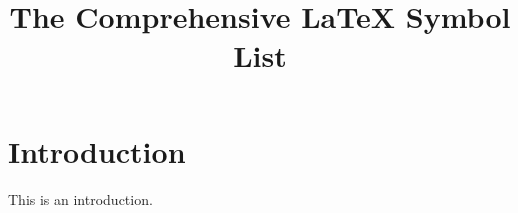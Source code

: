 \documentclass{article}
\title{The Comprehensive LaTeX Symbol List}
\begin{document}
\section{Introduction}

This is an introduction.
\end{document}

